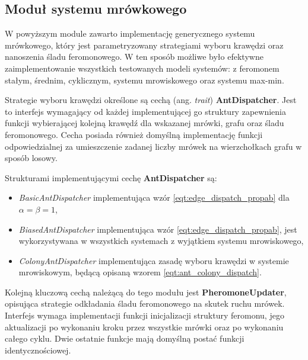 {{        \subsection{Moduł systemu mrówkowego}\label{sec:code_ant_colony}
        {
            W powyższym module zawarto implementację generycznego systemu mrówkowego, który jest parametryzowany
            strategiami wyboru krawędzi oraz nanoszenia śladu feromonowego. W ten sposób możliwe było efektywne
            zaimplementowanie wszystkich testowanych modeli systemów: z feromonem stałym, średnim, cyklicznym, systemu
            mrowiskowego oraz systemu max-min.

            Strategie wyboru krawędzi określone są cechą (ang. \textit{trait}) \textbf{AntDispatcher}. Jest to interfejs
            wymagający od każdej implementującej go struktury zapewnienia funkcji wybierającej kolejną krawędź dla
            wskazanej mrówki, grafu oraz śladu feromonowego. Cecha posiada również domyślną implementację funkcji
            odpowiedzialnej za umieszczenie zadanej liczby mrówek na wierzchołkach grafu w sposób losowy.

            Strukturami implementującymi cechę \textbf{AntDispatcher} są:

            \begin{itemize}
                \item \textit{BasicAntDispatcher} implementująca wzór \ref{eqt:edge_dispatch_propab} dla $\alpha = \beta
                = 1$,
                \item \textit{BiasedAntDispatcher} implementująca wzór \ref{eqt:edge_dispatch_propab}, jest
                wykorzystywana w wszystkich systemach z wyjątkiem systemu mrowiskowego,
                \item \textit{ColonyAntDispatcher} implementująca zasadę wyboru krawędzi w systemie mrowiskowym, będącą opisaną wzorem \ref{eqt:ant_colony_dispatch}.
            \end{itemize}

            Kolejną kluczową cechą należącą do tego modułu jest \textbf{PheromoneUpdater}, opisująca strategie
            odkładania śladu feromonowego na skutek ruchu mrówek. Interfejs wymaga implementacji funkcji inicjalizacji
            struktury feromonu, jego aktualizacji po wykonaniu kroku przez wszystkie mrówki oraz po wykonaniu całego
            cyklu. Dwie ostatnie funkcje mają domyślną postać funkcji identycznościowej.

}}}
